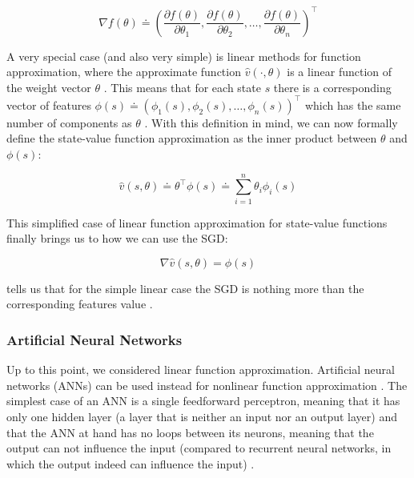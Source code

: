 \documentclass{seal_thesis}
\begin{document}
\begin{equation}
	\nabla f(\theta) \doteq \left( \frac{\partial f(\theta)}{\partial \theta_1}, \frac{\partial f(\theta)}{\partial \theta_2}, \ldots, \frac{\partial f(\theta)}{\partial \theta_n} \right)^\top
\end{equation}


A very special case (and also very simple) is linear methods for function approximation, where the approximate function $\hat{v} (\cdot ,\theta)$ is a linear function of the weight vector $\theta$ \cite[p. 198]{Sutton2017}. This means that for each state $s$ there is a corresponding vector of features $\phi (s) \doteq \left( \phi_1 (s), \phi_2 (s), \ldots, \phi_n (s) \right)^\top$ which has the same number of components as $\theta$ \cite[p. 198]{Sutton2017}. With this definition in mind, we can now formally define the state-value function approximation as the inner product between $\theta$ and $\phi (s)$:

\begin{equation}
\label{eq:function_approximation_dot}
	\hat{v} (s,\theta) \doteq \theta^\top \phi (s) \doteq \sum_{i=1}^n \theta_i \phi_i (s)
\end{equation}

This simplified case of linear function approximation for state-value functions finally brings us to how we can use the SGD:

\begin{equation}
\label{eq:sgd_linear}
	\nabla \hat{v} (s,\theta) = \phi (s)
\end{equation}

 tells us that for the simple linear case the SGD is nothing more than the corresponding features value  \cite[p. 199]{Sutton2017}.

\subsubsection{Artificial Neural Networks}

Up to this point, we considered linear function approximation. Artificial neural networks (ANNs) can be used instead for nonlinear function approximation \cite[p. 199]{Sutton2017}. The simplest case of an ANN is a single feedforward perceptron, meaning that it has only one hidden layer (\ie a layer that is neither an input nor an output layer) and that the ANN at hand has no loops between its neurons, meaning that the output can not influence the input (compared to recurrent neural networks, in which the output indeed can influence the input) \cite[p. 216]{Sutton2017}. 
\end{document}
